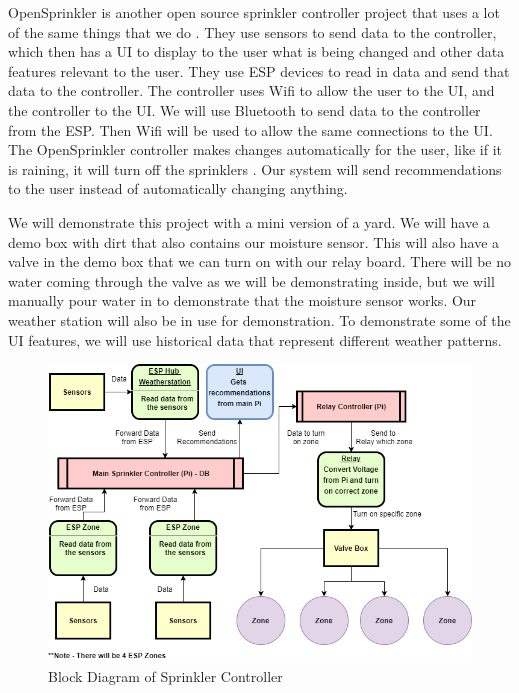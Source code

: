 \documentclass[letterpaper, 10 pt, conference]{ieeeconf}  %
\begin{document}
OpenSprinkler is another open source sprinkler controller project that uses a lot of the same things that we do \cite{OpenSprinkler}. They use sensors to send data to the controller, which then has a UI to display to the user what is being changed and other data features relevant to the user. They use ESP devices to read in data and send that data to the controller. The controller uses Wifi to allow the user to the UI, and the controller to the UI. We will use Bluetooth to send data to the controller from the ESP. Then Wifi will be used to allow the same connections to the UI. The OpenSprinkler controller makes changes automatically for the user, like if it is raining, it will turn off the sprinklers \cite{OpenSprinkler}. Our system will send recommendations to the user instead of automatically changing anything. 

We will demonstrate this project with a mini version of a yard. We will have a demo box with dirt that also contains our moisture sensor. This will also have a valve in the demo box that we can turn on with our relay board. There will be no water coming through the valve as we will be demonstrating inside, but we will manually pour water in to demonstrate that the moisture sensor works. Our weather station will also be in use for demonstration. To demonstrate some of the UI features, we will use historical data that represent different weather patterns. 

\begin{figure}
	\centering
	\includegraphics[width=\textwidth]{Diagram.png}
	\caption{Block Diagram of Sprinkler Controller}
	\label{label1}
\end{figure}
\end{document}
